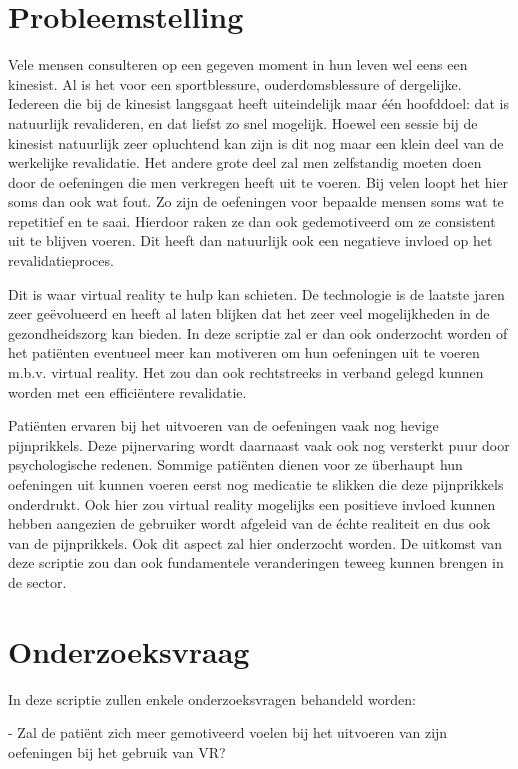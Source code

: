 \section{Probleemstelling}
\label{sec:probleemstelling}
Vele mensen consulteren op een gegeven moment in hun leven wel eens een kinesist. Al is het voor een sportblessure, ouderdomsblessure of dergelijke. Iedereen die bij de kinesist langsgaat heeft uiteindelijk maar één hoofddoel: dat is natuurlijk revalideren, en dat liefst zo snel mogelijk. Hoewel een sessie bij de kinesist natuurlijk zeer opluchtend kan zijn is dit nog maar een klein deel van de werkelijke revalidatie. Het andere grote deel zal men zelfstandig moeten doen door de oefeningen die men verkregen heeft uit te voeren. Bij velen loopt het hier soms dan ook wat fout. Zo zijn de oefeningen voor bepaalde mensen soms wat te repetitief en te saai. Hierdoor raken ze dan ook gedemotiveerd om ze consistent uit te blijven voeren. Dit heeft dan natuurlijk ook een negatieve invloed op het revalidatieproces. 

Dit is waar virtual reality te hulp kan schieten. De technologie is de laatste jaren zeer geëvolueerd en heeft al laten blijken dat het zeer veel mogelijkheden in de gezondheidszorg kan bieden. In deze scriptie zal er dan ook onderzocht worden of het patiënten eventueel meer kan motiveren om hun oefeningen uit te voeren m.b.v. virtual reality. Het zou dan ook rechtstreeks in verband gelegd kunnen worden met een efficiëntere revalidatie.

Patiënten ervaren bij het uitvoeren van de oefeningen vaak nog hevige pijnprikkels. Deze pijnervaring wordt daarnaast vaak ook nog versterkt puur door psychologische redenen. Sommige patiënten dienen voor ze überhaupt hun oefeningen uit kunnen voeren eerst nog medicatie te slikken die deze pijnprikkels onderdrukt. Ook hier zou virtual reality mogelijks een positieve invloed kunnen hebben aangezien de gebruiker wordt afgeleid van de échte realiteit en dus ook van de pijnprikkels. Ook dit aspect zal hier onderzocht worden. De uitkomst van deze scriptie zou dan ook fundamentele veranderingen teweeg kunnen brengen in de sector.


\section{Onderzoeksvraag}
\label{sec:onderzoeksvraag}

In deze scriptie zullen enkele onderzoeksvragen behandeld worden:

- Zal de patiënt zich meer gemotiveerd voelen bij het uitvoeren van zijn oefeningen bij het gebruik van VR?

